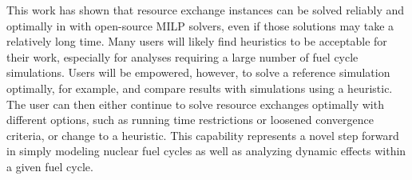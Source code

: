 This work has shown that resource exchange instances can be solved reliably and
optimally in \Cyclus with open-source MILP solvers, even if those solutions may
take a relatively long time. Many \Cyclus users will likely find heuristics to
be acceptable for their work, especially for analyses requiring a large number
of fuel cycle simulations. Users will be empowered, however, to solve a
reference simulation optimally, for example, and compare results with
simulations using a heuristic. The user can then either continue to solve
resource exchanges optimally with different options, such as running time
restrictions or loosened convergence criteria, or change to a heuristic. This
capability represents a novel step forward in simply modeling nuclear fuel
cycles as well as analyzing dynamic effects within a given fuel cycle.
